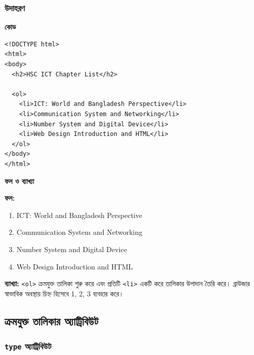 \subsubsection{উদাহরণ}

\par\noindent
\begin{minipage}[t]{.54\linewidth}\vspace{0pt}\small
\textbf{\color{chFourTeal}কোড}\par
\begin{verbatim}
<!DOCTYPE html>
<html>
<body>
  <h2>HSC ICT Chapter List</h2>

  <ol>
    <li>ICT: World and Bangladesh Perspective</li>
    <li>Communication System and Networking</li>
    <li>Number System and Digital Device</li>
    <li>Web Design Introduction and HTML</li>
  </ol>
</body>
</html>
\end{verbatim}

\par\smallskip
\end{minipage}\hfill
\begin{minipage}[t]{.42\linewidth}\vspace{0pt}\small
\textbf{\color{chFourTeal}ফল ও ব্যাখ্যা}\par
\textbf{ফল:}
\begin{enumerate}
\item ICT: World and Bangladesh Perspective
\item Communication System and Networking
\item Number System and Digital Device
\item Web Design Introduction and HTML
\end{enumerate}
\textbf{ব্যাখ্যা:} \texttt{<ol>} ক্রমযুক্ত তালিকা শুরু করে এবং প্রতিটি \texttt{<li>} একটি করে তালিকার উপাদান তৈরি করে। ব্রাউজার স্বাভাবিক অবস্থায় চিহ্ন হিসেবে 1, 2, 3 ব্যবহার করে।
\par\smallskip
\end{minipage}\par


\subsection{ক্রমযুক্ত তালিকার অ্যাট্রিবিউট}

\subsubsection{\texttt{type} অ্যাট্রিবিউট}

